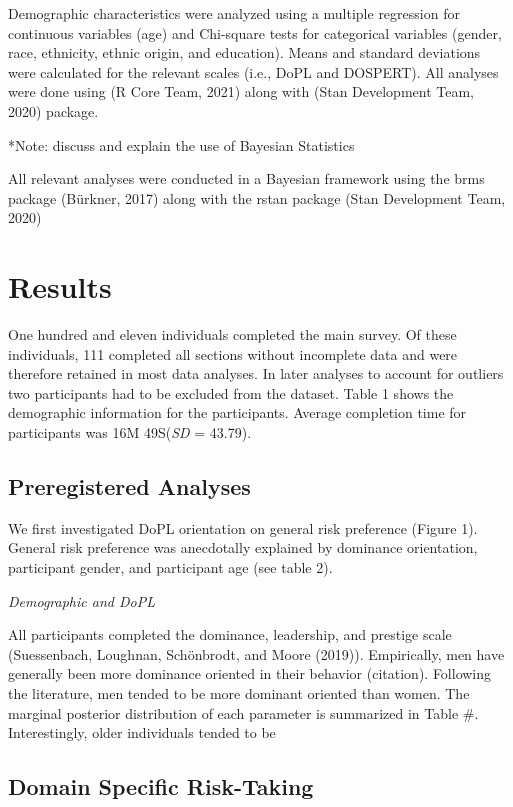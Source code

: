 \documentclass[
  english,
  man]{apa6}
\begin{document}
Demographic characteristics were analyzed using a multiple regression for continuous variables (age) and Chi-square tests for categorical variables (gender, race, ethnicity, ethnic origin, and education). Means and standard deviations were calculated for the relevant scales (i.e., DoPL and DOSPERT). All analyses were done using (R Core Team, 2021) along with (Stan Development Team, 2020) package.

*Note: discuss and explain the use of Bayesian Statistics

All relevant analyses were conducted in a Bayesian framework using the brms package (Bürkner, 2017) along with the rstan package (Stan Development Team, 2020)

\hypertarget{results}{%
\section{Results}\label{results}}

One hundred and eleven individuals completed the main survey. Of these individuals, 111 completed all sections without incomplete data and were therefore retained in most data analyses. In later analyses to account for outliers two participants had to be excluded from the dataset. Table 1 shows the demographic information for the participants. Average completion time for participants was 16M 49S(\emph{SD} = 43.79).

\hypertarget{preregistered-analyses}{%
\subsection{Preregistered Analyses}\label{preregistered-analyses}}

We first investigated DoPL orientation on general risk preference (Figure 1). General risk preference was anecdotally explained by dominance orientation, participant gender, and participant age (see table 2).

\emph{Demographic and DoPL}

All participants completed the dominance, leadership, and prestige scale (Suessenbach, Loughnan, Schönbrodt, and Moore (2019)). Empirically, men have generally been more dominance oriented in their behavior (citation). Following the literature, men tended to be more dominant oriented than women. The marginal posterior distribution of each parameter is summarized in Table \#. Interestingly, older individuals tended to be

\hypertarget{domain-specific-risk-taking-1}{%
\subsection{Domain Specific Risk-Taking}\label{domain-specific-risk-taking-1}}
\end{document}
